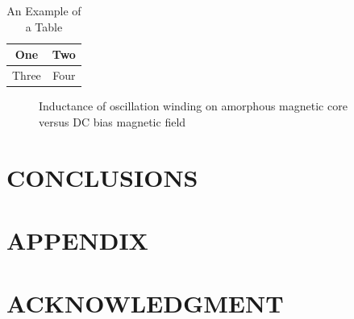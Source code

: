 \documentclass[a4paper, 10pt, conference]{ieeeconf}
\begin{document}
\begin{table}[h]
\caption{An Example of a Table}
\label{table_example}
\begin{center}
\begin{tabular}{|c||c|}
\hline
One & Two\\
\hline
Three & Four\\
\hline
\end{tabular}
\end{center}
\end{table}


   \begin{figure}[thpb]
      \centering
      \caption{Inductance of oscillation winding on amorphous
       magnetic core versus DC bias magnetic field}
      \label{figurelabel}
   \end{figure}
   



\section{CONCLUSIONS}
 

\addtolength{\textheight}{-12cm}   %







\section*{APPENDIX}


\section*{ACKNOWLEDGMENT}





%
%
\end{document}
